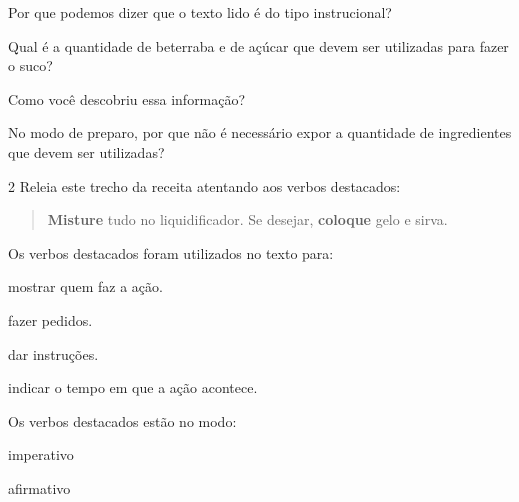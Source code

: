 \begin{escolha}
\item Por que podemos dizer que o texto lido é do tipo instrucional?


\item Qual é a quantidade de beterraba e de açúcar que devem ser utilizadas
para fazer o suco?


\item Como você descobriu essa informação?


\item No modo de preparo, por que não é necessário expor a quantidade de
ingredientes que devem ser utilizadas?

\end{escolha}

\pagebreak
\num{2} Releia este trecho da receita atentando aos verbos destacados:

\begin{quote}
\textbf{Misture} tudo no liquidificador. Se desejar, \textbf{coloque} gelo e sirva.
\end{quote}

\begin{escolha}
\item
  Os verbos destacados foram utilizados no texto para:

\begin{boxlist}
 mostrar quem faz a ação.

 fazer pedidos.

 dar instruções.

 indicar o tempo em que a ação acontece.
\end{boxlist}

\item
  Os verbos destacados estão no modo:

\begin{boxlist}
 imperativo

 afirmativo
\end{boxlist}

\end{escolha}

